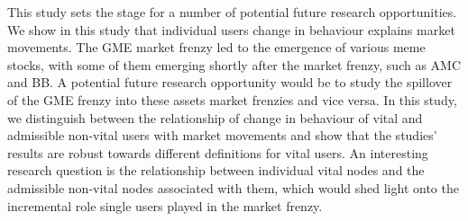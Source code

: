 This study sets the stage for a number of potential future research opportunities. We show in this study that individual users change in behaviour explains market movements. The GME market frenzy led to the emergence of various meme stocks, with some of them emerging shortly after the market frenzy, such as AMC and BB. A potential future research opportunity would be to study the spillover of the GME frenzy into these assets market frenzies and vice versa. In this study, we distinguish between the relationship of change in behaviour of vital and admissible non-vital users with market movements and show that the studies' results are robust towards different definitions for vital users. An interesting research question is the relationship between individual vital nodes and the admissible non-vital nodes associated with them, which would shed light onto the incremental role single users played in the market frenzy. %


